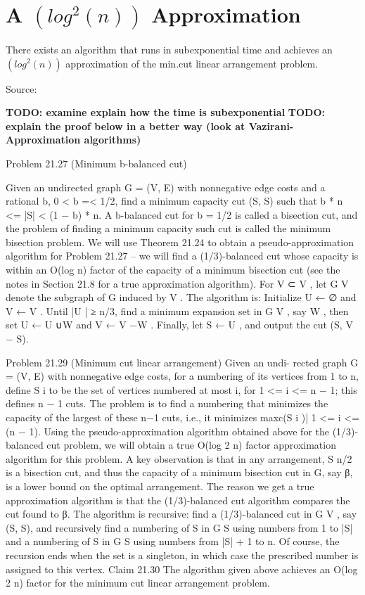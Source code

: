 \section{A $(log^2(n))$ Approximation}

There exists an algorithm that runs in subexponential time and achieves an
$(log^2(n))$ approximation of the min.cut linear arrangement problem. 

Source: \cite{vazi01}

\textbf{TODO: examine explain how the time is subexponential}
\textbf{TODO: explain the proof below in a better way (look at Vazirani-Approximation algorithms)}

Problem 21.27 (Minimum b-balanced cut)	

Given an undirected graph
G = (V, E) with nonnegative edge costs and a rational b, 0 < b =< 1/2, find a
minimum capacity cut (S, S) such that b * n <= |S| < (1 − b) * n.
A b-balanced cut for b = 1/2 is called a bisection cut, and the problem of
finding a minimum capacity such cut is called the minimum bisection problem.
We will use Theorem 21.24 to obtain a pseudo-approximation algorithm for
Problem 21.27 – we will find a (1/3)-balanced cut whose capacity is within
an O(log n) factor of the capacity of a minimum bisection cut (see the notes
in Section 21.8 for a true approximation algorithm).
For V ⊂ V , let G V denote the subgraph of G induced by V . The
algorithm is: Initialize U ← ∅ and V ← V . Until |U | ≥ n/3, find a minimum
expansion set in G V , say W , then set U ← U ∪W and V ← V −W . Finally,
let S ← U , and output the cut (S, V − S).

Problem 21.29 (Minimum cut linear arrangement) Given an undi-
rected graph G = (V, E) with nonnegative edge costs, for a numbering of its
vertices from 1 to n, define S i to be the set of vertices numbered at most i,
for 1 <= i <= n − 1; this defines n − 1 cuts. The problem is to find a numbering
that minimizes the capacity of the largest of these n−1 cuts, i.e., it minimizes
max{c(S i )| 1 <= i <= (n − 1)}.
Using the pseudo-approximation algorithm obtained above for the (1/3)-
balanced cut problem, we will obtain a true O(log 2 n) factor approximation
algorithm for this problem. A key observation is that in any arrangement,
S n/2 is a bisection cut, and thus the capacity of a minimum bisection cut
in G, say β, is a lower bound on the optimal arrangement. The reason we
get a true approximation algorithm is that the (1/3)-balanced cut algorithm
compares the cut found to β.
The algorithm is recursive: find a (1/3)-balanced cut in G V , say (S, S),
and recursively find a numbering of S in G S using numbers from 1 to |S|
and a numbering of S in G S using numbers from |S| + 1 to n. Of course,
the recursion ends when the set is a singleton, in which case the prescribed
number is assigned to this vertex.
Claim 21.30 The algorithm given above achieves an O(log 2 n) factor for the
minimum cut linear arrangement problem.
